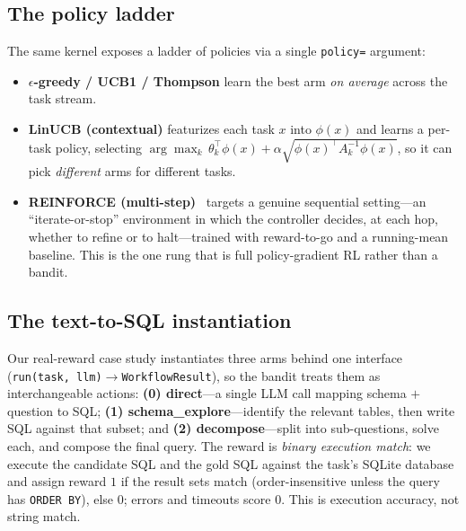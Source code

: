 \documentclass[conference]{IEEEtran}
\newcommand{\code}[1]{\texttt{#1}}
\begin{document}
\subsection{The policy ladder}
\label{sec:ladder}
The same kernel exposes a ladder of policies via a single \code{policy=} argument:

\begin{itemize}
  \item \textbf{$\epsilon$-greedy / UCB1 / Thompson} learn the best arm \emph{on
  average} across the task stream.
  \item \textbf{LinUCB (contextual)} featurizes each task $x$ into $\phi(x)$ and
  learns a per-task policy, selecting
  $\arg\max_k\, \theta_k^\top\phi(x) + \alpha\sqrt{\phi(x)^\top A_k^{-1}\phi(x)}$,
  so it can pick \emph{different} arms for different tasks.
  \item \textbf{REINFORCE (multi-step)}~\cite{williams} targets a genuine sequential setting---an
  ``iterate-or-stop'' environment in which the controller decides, at each hop,
  whether to refine or to halt---trained with reward-to-go and a running-mean
  baseline. This is the one rung that is full policy-gradient RL rather than a
  bandit.
\end{itemize}

\subsection{The text-to-SQL instantiation}
Our real-reward case study instantiates three arms behind one interface
(\code{run(task, llm)}$\rightarrow$\code{WorkflowResult}), so the bandit treats them
as interchangeable actions:
\textbf{(0) direct}---a single LLM call mapping schema $+$ question to SQL;
\textbf{(1) schema\_explore}---identify the relevant tables, then write SQL against
that subset; and
\textbf{(2) decompose}---split into sub-questions, solve each, and compose the final
query. The reward is \emph{binary execution match}: we execute the candidate SQL and
the gold SQL against the task's SQLite database and assign reward $1$ if the result
sets match (order-insensitive unless the query has \code{ORDER BY}), else $0$;
errors and timeouts score $0$. This is execution accuracy, not string match.

\end{document}
